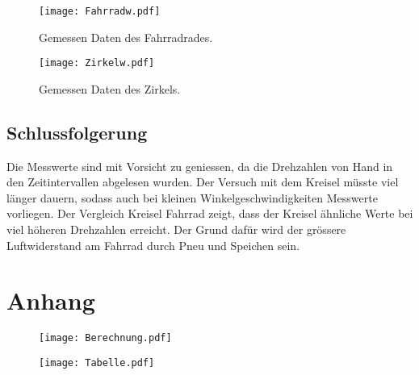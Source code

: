 \documentclass{article}
\begin{document}
\begin{figure}[H]
\texttt{[image: Fahrradw.pdf]} 
\caption{Gemessen Daten des Fahrradrades.}
\end{figure}
\begin{figure}[H]
\texttt{[image: Zirkelw.pdf]} 
\caption{Gemessen Daten des Zirkels.}
\end{figure}



\subsection{Schlussfolgerung}
Die Messwerte sind mit Vorsicht zu geniessen, da die Drehzahlen von Hand in den Zeitintervallen
abgelesen wurden. 
Der Versuch mit dem Kreisel müsste viel länger dauern, sodass auch bei kleinen Winkelgeschwindigkeiten
Messwerte vorliegen.
Der Vergleich Kreisel Fahrrad zeigt, dass der Kreisel ähnliche Werte bei viel höheren Drehzahlen
erreicht. Der Grund dafür wird der grössere Luftwiderstand am Fahrrad durch Pneu und Speichen
sein.
\newpage
\section{Anhang}

\begin{figure}[H]

\texttt{[image: Berechnung.pdf]} 
\end{figure} 

\begin{figure}[H]

\texttt{[image: Tabelle.pdf]} 
\end{figure} 
\end{document}
